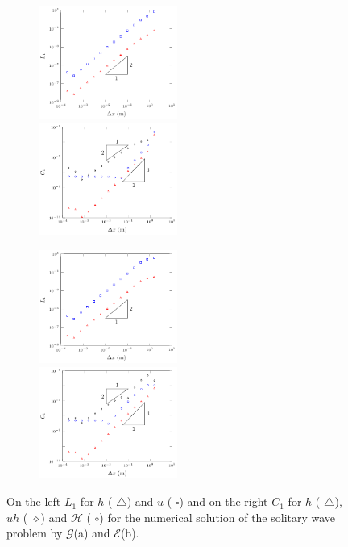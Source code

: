 \documentclass[SingleSpace,12pt,Journal]{Serre_ASCE}
\begin{document}
\begin{figure}
	\centering
	\begin{subfigure}{\textwidth}
		\includegraphics[width=0.5\textwidth]{pics/results/soliton/L1/FDc.pdf}
		\includegraphics[width=0.5\textwidth]{pics/results/soliton/C1/FDc.pdf}
		\caption{}
	\end{subfigure}
	\begin{subfigure}{\textwidth}
		\includegraphics[width=0.5\textwidth]{pics/results/soliton/L1/grim.pdf}
		\includegraphics[width=0.5\textwidth]{pics/results/soliton/C1/grim.pdf}
		\caption{}
	\end{subfigure}
\caption{On the left $L_1$ for $h$ ({\color{red} $\triangle$}) and $u$ ({\color{blue} $\square$}) and on the right $C_1$ for $h$ ({\color{red} $\triangle$}), $uh$ ({\color{black} $\diamond$}) and $\mathcal{H}$ ({\color{blue} $\circ$}) for the numerical solution of the solitary wave problem by $\mathcal{G}$(a) and $\mathcal{E}$(b).}
\label{fig:FDMsolnorm}
\end{figure}
%
\end{document}
